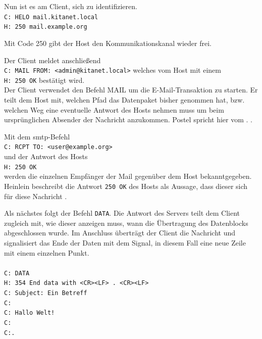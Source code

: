 Nun ist es am Client, sich zu identifizieren. \\
\verb+C: HELO mail.kitanet.local+ \\ 
\verb+H: 250 mail.example.org+

Mit Code 250  \citep[][38]{rfc821} gibt der Host den Kommunikationskanal wieder frei.

Der Client meldet anschließend \\
\verb+C: MAIL FROM: <admin@kitanet.local>+ welches vom Host mit einem \\
\verb+H: 250 OK+ bestätigt wird.\\
Der Client verwendet den Befehl MAIL um die E-Mail-Transaktion zu starten. Er teilt dem Host mit, welchen Pfad das Datenpaket bisher genommen hat, bzw. welchen Weg eine eventuelle Antwort des Hosts nehmen muss um beim ursprünglichen Absender der Nachricht anzukommen. Postel spricht hier vom . \citep[vgl.][20]{rfc821}.

Mit dem \ac{smtp}-Befehl\\
\verb+C: RCPT TO: <user@example.org>+ \\ 
und der Antwort des Hosts \\
\verb+H: 250 OK+\\
werden die einzelnen Empfänger der Mail gegenüber dem Host bekanntgegeben. Heinlein beschreibt die Antwort \verb+250 OK+ des Hosts als Aussage, dass dieser sich für diese Nachricht  \citep[vgl.][25]{Heinlein2004}.

Als nächstes folgt der Befehl \verb+DATA+. Die Antwort des Servers teilt dem Client zugleich mit, wie dieser anzeigen muss, wann die Übertragung des Datenblocks abgeschlossen wurde. Im Anschluss überträgt der Client die Nachricht und signalisiert das Ende der Daten mit dem Signal, in diesem Fall eine neue Zeile mit einem einzelnen Punkt.\\
\\
\verb+C: DATA+ \\
\verb+H: 354 End data with <CR><LF> . <CR><LF>+\\
\verb+C: Subject: Ein Betreff+ \\
\verb+C:+\\
\verb+C: Hallo Welt!+ \\
\verb+C:+\\ 
\verb+C:.+

